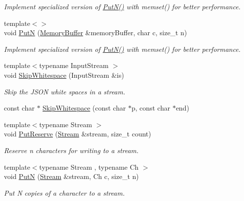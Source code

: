 \begin{DoxyCompactItemize}
\begin{DoxyCompactList}\small\item\em Implement specialized version of \mbox{\hyperlink{namespacerapidjson_a1ac13bac5976fc06587e00fc0bcfb32a}{Put\+N()}} with memset() for better performance. \end{DoxyCompactList}\item 
{\footnotesize template$<$$>$ }\\void \mbox{\hyperlink{namespacerapidjson_aba27b0c8dcf724aa2b288a24fda0811b}{PutN}} (\mbox{\hyperlink{namespacerapidjson_acb643b9055e7988f4cb89ce4f7e6b115}{Memory\+Buffer}} \&memory\+Buffer, char c, size\+\_\+t n)
\begin{DoxyCompactList}\small\item\em Implement specialized version of \mbox{\hyperlink{namespacerapidjson_a1ac13bac5976fc06587e00fc0bcfb32a}{Put\+N()}} with memset() for better performance. \end{DoxyCompactList}\item 
{\footnotesize template$<$typename Input\+Stream $>$ }\\void \mbox{\hyperlink{namespacerapidjson_a6efb0f4d2a6f81477a59718d42e9464a}{Skip\+Whitespace}} (Input\+Stream \&is)
\begin{DoxyCompactList}\small\item\em Skip the J\+S\+ON white spaces in a stream. \end{DoxyCompactList}\item 
const char $\ast$ \mbox{\hyperlink{namespacerapidjson_a946a04b733bc148c13e7b3b0721cabcc}{Skip\+Whitespace}} (const char $\ast$p, const char $\ast$end)
\item 
{\footnotesize template$<$typename Stream $>$ }\\void \mbox{\hyperlink{namespacerapidjson_a820f77efccfbb749bd15fe4822d2c740}{Put\+Reserve}} (\mbox{\hyperlink{classrapidjson_1_1_stream}{Stream}} \&stream, size\+\_\+t count)
\begin{DoxyCompactList}\small\item\em Reserve n characters for writing to a stream. \end{DoxyCompactList}\item 
{\footnotesize template$<$typename Stream , typename Ch $>$ }\\void \mbox{\hyperlink{namespacerapidjson_a1d49d2cab617858b53a1db23b1759f43}{PutN}} (\mbox{\hyperlink{classrapidjson_1_1_stream}{Stream}} \&stream, Ch c, size\+\_\+t n)
\begin{DoxyCompactList}\small\item\em Put N copies of a character to a stream. \end{DoxyCompactList}\item 

\end{DoxyCompactItemize}

